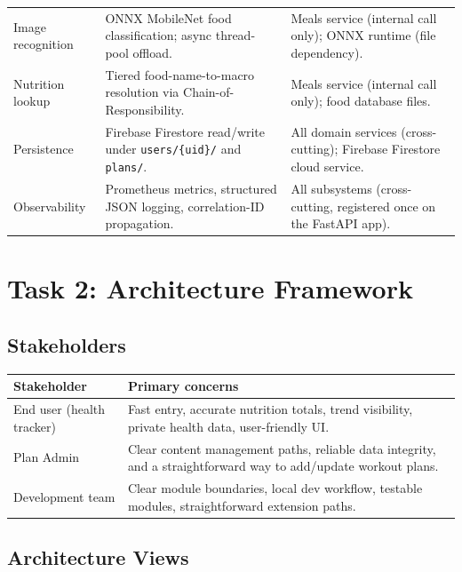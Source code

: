 \documentclass[11pt]{article}
\begin{document}
\begin{longtable}{p{3.5cm} p{5.5cm} p{5.2cm}}
  Image recognition
  & ONNX MobileNet food classification; async thread-pool offload.
  & Meals service (internal call only); ONNX runtime (file dependency). \\

  Nutrition lookup
  & Tiered food-name-to-macro resolution via Chain-of-Responsibility.
  & Meals service (internal call only); food database files. \\

  Persistence
  & Firebase Firestore read/write under \texttt{users/\{uid\}/} and \texttt{plans/}.
  & All domain services (cross-cutting); Firebase Firestore cloud service. \\

  Observability
  & Prometheus metrics, structured JSON logging, correlation-ID propagation.
  & All subsystems (cross-cutting, registered once on the FastAPI app). \\

  \bottomrule
\end{longtable}

\newpage
\section{Task 2: Architecture Framework}

\subsection{Stakeholders}

\begin{longtable}{p{5.0cm} p{8.5cm}}
  \toprule
  \textbf{Stakeholder} & \textbf{Primary concerns} \\
  \midrule
  \endhead

  End user (health tracker)
    & Fast entry, accurate nutrition totals, trend visibility,
      private health data, user-friendly UI. \\
  Plan Admin
    & Clear content management paths, reliable data integrity,
      and a straightforward way to add/update workout plans. \\
  Development team
    & Clear module boundaries, local dev workflow, testable
      modules, straightforward extension paths. \\
  \bottomrule
\end{longtable}

\subsection{Architecture Views}
\end{document}
